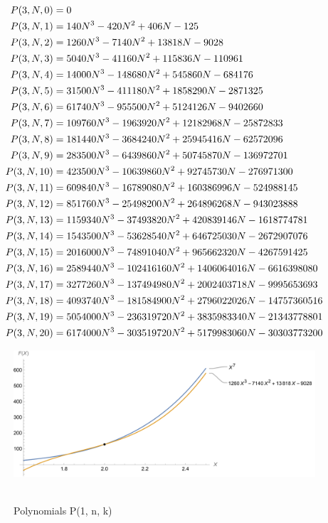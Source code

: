 ﻿\begin{align*}
    {P}(3,N,0) &= 0 \\
    {P}(3,N,1) &= 140N^3 - 420N^2 + 406N - 125 \\
    {P}(3,N,2) &= 1260N^3 - 7140N^2 + 13818N - 9028 \\
    {P}(3,N,3) &= 5040N^3 - 41160N^2 + 115836N - 110961 \\
    {P}(3,N,4) &= 14000N^3 - 148680N^2 + 545860N - 684176 \\
    {P}(3,N,5) &= 31500N^3 - 411180N^2 + 1858290N - 2871325 \\
    {P}(3,N,6) &= 61740N^3 - 955500N^2 + 5124126N - 9402660 \\
    {P}(3,N,7) &= 109760N^3 - 1963920N^2 + 12182968N - 25872833 \\
    {P}(3,N,8) &= 181440N^3 - 3684240N^2 + 25945416N - 62572096 \\
    {P}(3,N,9) &= 283500N^3 - 6439860N^2 + 50745870N - 136972701 \\
    {P}(3,N,10) &= 423500N^3 - 10639860N^2 + 92745730N - 276971300 \\
    {P}(3,N,11) &= 609840N^3 - 16789080N^2 + 160386996N - 524988145 \\
    {P}(3,N,12) &= 851760N^3 - 25498200N^2 + 264896268N - 943023888 \\
    {P}(3,N,13) &= 1159340N^3 - 37493820N^2 + 420839146N - 1618774781 \\
    {P}(3,N,14) &= 1543500N^3 - 53628540N^2 + 646725030N - 2672907076 \\
    {P}(3,N,15) &= 2016000N^3 - 74891040N^2 + 965662320N - 4267591425 \\
    {P}(3,N,16) &= 2589440N^3 - 102416160N^2 + 1406064016N - 6616398080 \\
    {P}(3,N,17) &= 3277260N^3 - 137494980N^2 + 2002403718N - 9995653693 \\
    {P}(3,N,18) &= 4093740N^3 - 181584900N^2 + 2796022026N - 14757360516 \\
    {P}(3,N,19) &= 5054000N^3 - 236319720N^2 + 3835983340N - 21343778801 \\
    {P}(3,N,20) &= 6174000N^3 - 303519720N^2 + 5179983060N - 30303773200
\end{align*}
\begin{figure}[H]
    \centering
    \includegraphics[width=1\textwidth]{sections/images/05_seventh_power_with_p_3_n_k}
    ~\caption{Polynomials P(1, n, k)}\label{fig:figure5}
\end{figure}
